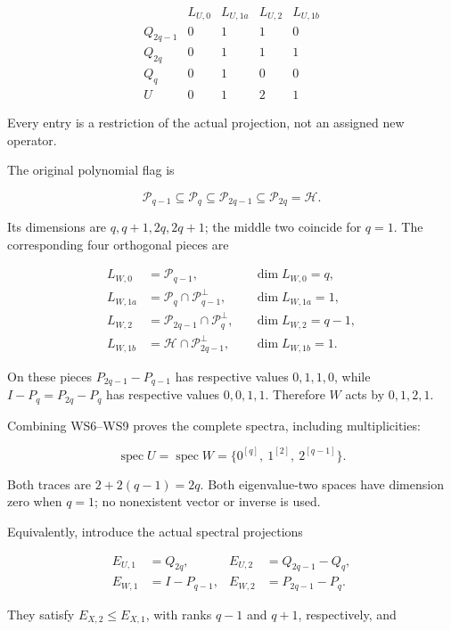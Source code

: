 \[
\begin{array}{c|rrrr}
&L_{U,0}&L_{U,1a}&L_{U,2}&L_{U,1b}\\\hline
Q_{2q-1}&0&1&1&0\\
Q_{2q}&0&1&1&1\\
Q_q&0&1&0&0\\\hline
U&0&1&2&1
\end{array}
\tag{WS7}
\]

Every entry is a restriction of the actual projection, not an assigned new operator.

The original polynomial flag is

\[
\mathcal P_{q-1}\subseteq\mathcal P_q
\subseteq\mathcal P_{2q-1}\subseteq\mathcal P_{2q}=\mathcal H.
\tag{WS8}
\]

Its dimensions are \(q,q+1,2q,2q+1\); the middle two coincide for \(q=1\). The corresponding four orthogonal pieces are

\[
\begin{aligned}
L_{W,0}&=\mathcal P_{q-1},&&\dim L_{W,0}=q,\\
L_{W,1a}&=\mathcal P_q\cap\mathcal P_{q-1}^{\perp},
&&\dim L_{W,1a}=1,\\
L_{W,2}&=\mathcal P_{2q-1}\cap\mathcal P_q^{\perp},
&&\dim L_{W,2}=q-1,\\
L_{W,1b}&=\mathcal H\cap\mathcal P_{2q-1}^{\perp},
&&\dim L_{W,1b}=1.
\end{aligned}
\tag{WS9}
\]

On these pieces \(P_{2q-1}-P_{q-1}\) has respective values \(0,1,1,0\), while \(I-P_q=P_{2q}-P_q\) has respective values \(0,0,1,1\). Therefore \(W\) acts by \(0,1,2,1\).

Combining WS6--WS9 proves the complete spectra, including multiplicities:

\[
\boxed{\quad
\operatorname{spec}U=\operatorname{spec}W
=\{0^{[q]},\ 1^{[2]},\ 2^{[q-1]}\}.
\quad}
\tag{WS10}
\]

Both traces are \(2+2(q-1)=2q\). Both eigenvalue-two spaces have dimension zero when \(q=1\); no nonexistent vector or inverse is used.

Equivalently, introduce the actual spectral projections

\[
\begin{aligned}
E_{U,1}&=Q_{2q},&E_{U,2}&=Q_{2q-1}-Q_q,\\
E_{W,1}&=I-P_{q-1},&E_{W,2}&=P_{2q-1}-P_q.
\end{aligned}
\tag{WS11}
\]

They satisfy \(E_{X,2}\le E_{X,1}\), with ranks \(q-1\) and \(q+1\), respectively, and

